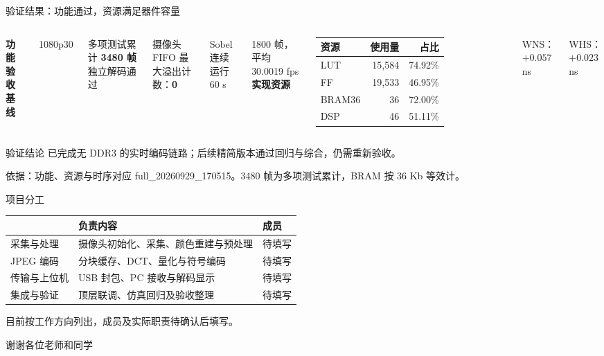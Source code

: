 \documentclass[aspectratio=169,11pt]{beamer}
\renewcommand{\arraystretch}{1.23}
\newcommand{\key}[1]{{\color{teal}\bfseries #1}}
\newcommand{\source}[1]{\par\vfill{\fontsize{6.8}{8}\selectfont\color{muted}依据：#1\par}}
\newcommand{\smallnote}[1]{\par{\footnotesize\color{muted}#1\par}}
\begin{document}
\begin{frame}{验证结果：功能通过，资源满足器件容量}
\begin{columns}[T,onlytextwidth]
\key{功能验收基线}\par
{\fontsize{30}{34}\selectfont\color{teal}1080p30}\par
\small 多项测试累计 \key{3480 帧}独立解码通过\par
摄像头 FIFO 最大溢出计数：\key{0}\par
\vspace{2mm}
Sobel 连续运行 60 s\par
1800 帧，平均 30.0019 fps
\key{实现资源}\par
\small
\begin{tabular}{@{}lrr@{}}
\toprule
资源 & 使用量 & 占比\\\midrule
LUT & 15,584 & 74.92\%\\
FF & 19,533 & 46.95\%\\
BRAM36 & 36 & 72.00\%\\
DSP & 46 & 51.11\%\\\bottomrule
\end{tabular}\par
\vspace{2mm}
WNS：$+0.057$ ns\par
WHS：$+0.023$ ns
\end{columns}
\vspace{3mm}
\begin{block}{验证结论}
\small 已完成无 DDR3 的实时编码链路；后续精简版本通过回归与综合，仍需重新验收。
\end{block}
\source{功能、资源与时序对应 full\_20260929\_170515。3480 帧为多项测试累计，BRAM 按 36 Kb 等效计。}
\end{frame}

\begin{frame}{项目分工}
\small
\renewcommand{\arraystretch}{1.65}
\begin{tabular}{@{}>{\raggedright\arraybackslash}p{2.25cm}>{\raggedright\arraybackslash}p{6.8cm}p{2.5cm}@{}}
\toprule
\key{工作方向} & \key{负责内容} & \key{成员}\\\midrule
采集与处理 & 摄像头初始化、采集、颜色重建与预处理 & 待填写\\
JPEG 编码 & 分块缓存、DCT、量化与符号编码 & 待填写\\
传输与上位机 & USB 封包、PC 接收与解码显示 & 待填写\\
集成与验证 & 顶层联调、仿真回归及验收整理 & 待填写\\\bottomrule
\end{tabular}
\vspace{5mm}
\smallnote{目前按工作方向列出，成员及实际职责待确认后填写。}
\vfill
\centering\large\color{teal}谢谢各位老师和同学
\end{frame}
\end{document}
